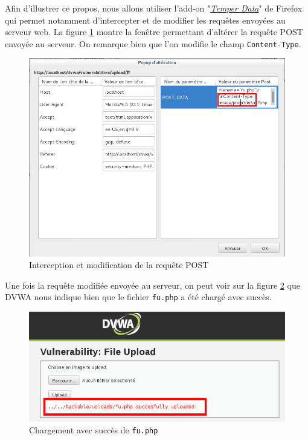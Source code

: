 Afin d'illustrer ce propos, nous allons utiliser l'add-on "\href{https://addons.mozilla.org/fr/firefox/addon/tamper-data/}{\textit{Temper Data}}" de Firefox qui permet notamment d'intercepter et de modifier les requêtes envoyées au serveur web. La figure \ref{fu_dvwa4} montre la fenêtre permettant d'altérer la requête POST envoyée au serveur. On remarque bien que l'on modifie le champ \texttt{Content-Type}.

\begin{figure}[!h]
\begin{center}
\includegraphics[scale=.45]{images/fu4.png}

\caption{Interception et modification de la requête POST}
\label{fu_dvwa4}
\end{center}
\end{figure}

Une fois la requête modifiée envoyée au serveur, on peut voir sur la figure \ref{fu_dvwa5} que DVWA nous indique bien que le fichier \texttt{fu.php} a été chargé avec succès.

\begin{figure}[!h]
\begin{center}
\includegraphics[scale=.45]{images/fu5.png}

\caption{Chargement avec succès de \texttt{fu.php}}
\label{fu_dvwa5}
\end{center}
\end{figure}

